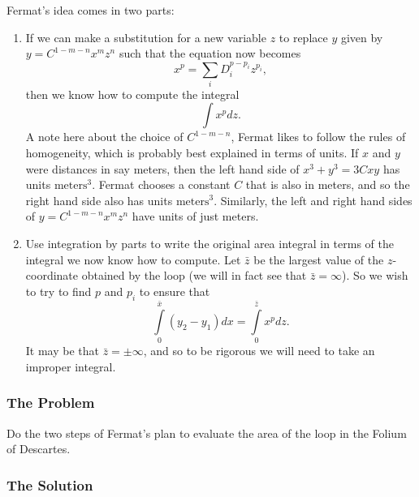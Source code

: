 Fermat's idea comes in two parts:
\begin{enumerate}
\item If we can make a substitution for a new variable \(z\) to replace \(y\) given by \(y = C^{1 - m - n} x^m z^n\) such that the equation
now becomes
\begin{equation}
x^p = \sum\limits_{i} D_i^{p - p_i} z^{p_i},
\end{equation}
then we know how to compute the integral
\begin{equation}
\int\limits x^p dz.
\end{equation}
A note here about the choice of \(C^{1 - m - n}\), Fermat likes to follow the rules of homogeneity, which is probably best explained
in terms of units. If \(x\) and \(y\) were distances in say meters, then the left hand side of \(x^3 + y^3 = 3Cxy\) has units 
\(\text{meters}^3\). Fermat chooses a constant \(C\) that is also in meters, and so the right hand side also has units
\(\text{meters}^3\). Similarly, the left and right hand sides of \(y = C^{1 - m -n} x^m z^n\) have units of just meters. 

\item Use integration by parts to write the original area integral in terms of the integral we now know how to compute. Let \(\bar z\) be
the largest value of the \(z\)-coordinate obtained by the loop (we will in fact see that \(\bar z = \infty\)). So we wish to try to find 
\(p\) and \(p_i\) to ensure that
\begin{equation}
\int\limits_0^{\bar x} (y_2 - y_1) dx = \int\limits_0^{\bar z} x^p dz.
\end{equation}  
It may be that \(\bar z = \pm \infty\), and so to be rigorous we will need to take an improper integral.
\end{enumerate}

\subsubsection*{The Problem}

Do the two steps of Fermat's plan to evaluate the area of the loop in the Folium of Descartes.

\subsubsection*{The Solution}

